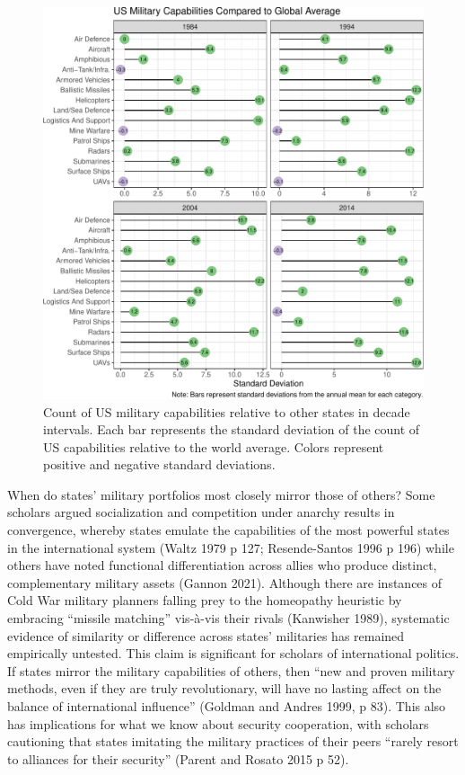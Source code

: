 \documentclass[
]{article}
\begin{document}
\begin{figure}
\centering
\includegraphics{figures/lollipop-us-1.pdf}
\caption{\label{fig:lollipop-us}Count of US military capabilities relative to other states in decade intervals. Each bar represents the standard deviation of the count of US capabilities relative to the world average. Colors represent positive and negative standard deviations.}
\end{figure}

When do states' military portfolios most closely mirror those of others? Some scholars argued socialization and competition under anarchy results in convergence, whereby states emulate the capabilities of the most powerful states in the international system (Waltz 1979 p 127; Resende-Santos 1996 p 196) while others have noted functional differentiation across allies who produce distinct, complementary military assets (Gannon 2021). Although there are instances of Cold War military planners falling prey to the homeopathy heuristic by embracing ``missile matching'' vis-à-vis their rivals (Kanwisher 1989), systematic evidence of similarity or difference across states' militaries has remained empirically untested. This claim is significant for scholars of international politics. If states mirror the military capabilities of others, then ``new and proven military methods, even if they are truly revolutionary, will have no lasting affect on the balance of international influence'' (Goldman and Andres 1999, p 83). This also has implications for what we know about security cooperation, with scholars cautioning that states imitating the military practices of their peers ``rarely resort to alliances for their security'' (Parent and Rosato 2015 p 52).
\end{document}
